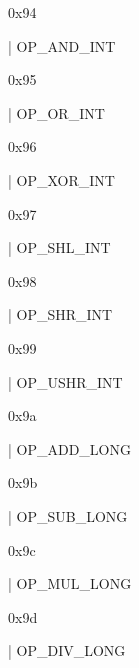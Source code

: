 \documentclass[11pt]{article}
\begin{document}
\begin{ocamldoccomment}
0x94
\end{ocamldoccomment}
\begin{ocamldoccode}
  | OP_AND_INT
\end{ocamldoccode}
\begin{ocamldoccomment}
0x95
\end{ocamldoccomment}
\begin{ocamldoccode}
  | OP_OR_INT
\end{ocamldoccode}
\begin{ocamldoccomment}
0x96
\end{ocamldoccomment}
\begin{ocamldoccode}
  | OP_XOR_INT
\end{ocamldoccode}
\begin{ocamldoccomment}
0x97
\end{ocamldoccomment}
\begin{ocamldoccode}
  | OP_SHL_INT
\end{ocamldoccode}
\begin{ocamldoccomment}
0x98
\end{ocamldoccomment}
\begin{ocamldoccode}
  | OP_SHR_INT
\end{ocamldoccode}
\begin{ocamldoccomment}
0x99
\end{ocamldoccomment}
\begin{ocamldoccode}
  | OP_USHR_INT
\end{ocamldoccode}
\begin{ocamldoccomment}
0x9a
\end{ocamldoccomment}
\begin{ocamldoccode}
  | OP_ADD_LONG
\end{ocamldoccode}
\begin{ocamldoccomment}
0x9b
\end{ocamldoccomment}
\begin{ocamldoccode}
  | OP_SUB_LONG
\end{ocamldoccode}
\begin{ocamldoccomment}
0x9c
\end{ocamldoccomment}
\begin{ocamldoccode}
  | OP_MUL_LONG
\end{ocamldoccode}
\begin{ocamldoccomment}
0x9d
\end{ocamldoccomment}
\begin{ocamldoccode}
  | OP_DIV_LONG
\end{ocamldoccode}
\end{document}
